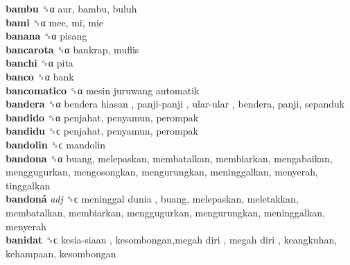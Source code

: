 \textbf{bambu} ␝α  aur, bambu, buluh  \\
\textbf{bami} ␝α  mee, mi, mie  \\
\textbf{banana} ␝α  pisang  \\
\textbf{bancarota} ␝α  bankrap, muflis  \\
\textbf{banchi} ␝α  pita  \\
\textbf{banco} ␝α  bank  \\
\textbf{bancomatico} ␝α   mesin juruwang automatik   \\
\textbf{bandera} ␝α   bendera hiasan ,  panji-panji ,  ular-ular , bendera, panji, sepanduk  \\
\textbf{bandido} ␝α  penjahat, penyamun, perompak  \\
\textbf{bandidu} ␝ϲ  penjahat, penyamun, perompak  \\
\textbf{bandolin} ␝ϲ  mandolin  \\
\textbf{bandona} ␝α  buang, melepaskan, membatalkan, membiarkan, mengabaikan, menggugurkan, mengosongkan, mengurungkan, meninggalkan, menyerah, tinggalkan  \\
\textbf{bandoná} \emph{adj}  ␝ϲ   meninggal dunia , buang, melepaskan, meletakkan, membatalkan, membiarkan, menggugurkan, mengurungkan, meninggalkan, menyerah  \\
\textbf{banidat} ␝ϲ   kesia-siaan ,  kesombongan,megah diri ,  megah diri , keangkuhan, kehampaan, kesombongan  \\
